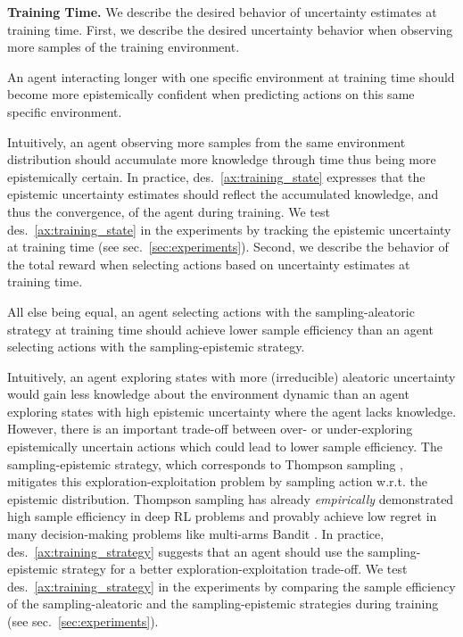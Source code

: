 \textbf{Training Time.} We describe the desired behavior of uncertainty estimates at training time. First, we describe the desired uncertainty behavior when observing more samples of the training environment.
\begin{desiderata}
    \label{ax:training_state}
    An agent interacting longer with one specific environment at training time should become more epistemically confident when predicting actions on this same specific environment.
\end{desiderata}
\vspace{-2mm}
Intuitively, an agent observing more samples from the same environment distribution should accumulate more knowledge through time thus being more epistemically certain. In practice, des.~\ref{ax:training_state} expresses that the epistemic uncertainty estimates should reflect the accumulated knowledge, and thus the convergence, of the agent during training. We test des.~\ref{ax:training_state} in the experiments by tracking the epistemic uncertainty at training time (see sec.~\ref{sec:experiments}). Second, we describe the behavior of the total reward when selecting actions based on uncertainty estimates at training time.
\begin{desiderata}
    \label{ax:training_strategy}
    All else being equal, an agent selecting actions with the sampling-aleatoric strategy at training time should achieve lower sample efficiency than an agent selecting actions with the sampling-epistemic strategy.
\end{desiderata}
Intuitively, an agent exploring states with more (irreducible) aleatoric uncertainty would gain less knowledge about the environment dynamic than an agent exploring states with high epistemic uncertainty where the agent lacks knowledge. However, there is an important trade-off between over- or under-exploring epistemically uncertain actions which could lead to lower sample efficiency. The sampling-epistemic strategy, which corresponds to Thompson sampling \cite{thompson-sampling}, mitigates this exploration-exploitation problem by sampling action w.r.t. the epistemic distribution. Thompson sampling has already \emph{empirically} demonstrated high sample efficiency in deep RL problems \cite{dropout} and provably achieve low regret in many decision-making problems like multi-arms Bandit \cite{thompson-sampling-mab, thompson-sampling-information}. In practice, des.~\ref{ax:training_strategy} suggests that an agent should use the sampling-epistemic strategy for a better exploration-exploitation trade-off. We test des.~\ref{ax:training_strategy} in the experiments by comparing the sample efficiency of the sampling-aleatoric and the sampling-epistemic strategies during training (see sec.~\ref{sec:experiments}).

